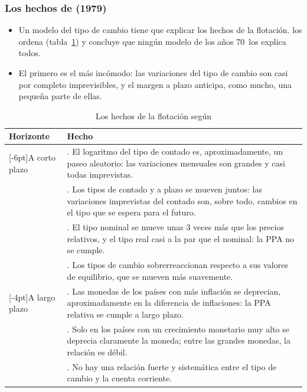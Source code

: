 \documentclass[11pt]{article}
\begin{document}
\subsubsection{Los hechos de  (1979)}\label{sec:mussa}

\begin{itemize}
\item Un modelo del tipo de cambio tiene que explicar los hechos de la flotación. \textcite{Mussa1979Empirical} los ordena (tabla~\ref{tab:mussa}) y concluye que ningún modelo de los años 70~los explica todos.
\item El primero es el más incómodo: las variaciones del tipo de cambio son casi por completo imprevisibles, y el margen a plazo anticipa, como mucho, una pequeña parte de ellas.
\end{itemize}

\begin{table}[H]
\centering
\caption{Los hechos de la flotación según }\label{tab:mussa}
\small
\begin{tabular}{>{\centering\arraybackslash}m{2.2cm}>{\raggedright\arraybackslash}m{11.6cm}}
\toprule
\rowcolor{tceeazulpalido}\textbf{Horizonte} & \textbf{Hecho}\\
\midrule
\multirow{4}{=}[-6pt]{\centering A corto plazo} & 1. El logaritmo del tipo de contado es, aproximadamente, un paseo aleatorio: las variaciones mensuales son grandes y casi todas imprevistas.\\
 & 2. Los tipos de contado y a plazo se mueven juntos: las variaciones imprevistas del contado son, sobre todo, cambios en el tipo que se espera para el futuro.\\
 & 3. El tipo nominal se mueve unas 3 veces más que los precios relativos, y el tipo real casi a la par que el nominal: la PPA no se cumple.\\
 & 4. Los tipos de cambio sobrerreaccionan respecto a sus valores de equilibrio, que se mueven más suavemente.\\
\midrule
\multirow{3}{=}[-4pt]{\centering A largo plazo} & 5. Las monedas de los países con más inflación se deprecian, aproximadamente en la diferencia de inflaciones: la PPA relativa se cumple a largo plazo.\\
 & 6. Solo en los países con un crecimiento monetario muy alto se deprecia claramente la moneda; entre las grandes monedas, la relación es débil.\\
 & 7. No hay una relación fuerte y sistemática entre el tipo de cambio y la cuenta corriente.\\
\bottomrule
\end{tabular}
\end{table}
\end{document}
